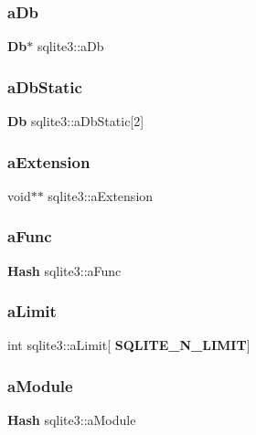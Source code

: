 \mbox{\label{structsqlite3_a0abe1dccdea5f43e6c49360b42749697}} 
\subsubsection{aDb}
{\footnotesize\ttfamily \textbf{ Db}$\ast$ sqlite3\+::a\+Db}

\mbox{\label{structsqlite3_ad99069213dff7fede71447b97d22d710}} 
\subsubsection{aDbStatic}
{\footnotesize\ttfamily \textbf{ Db} sqlite3\+::a\+Db\+Static[2]}

\mbox{\label{structsqlite3_aa97954113d8e35c97f8a3af534703f7b}} 
\subsubsection{aExtension}
{\footnotesize\ttfamily void$\ast$$\ast$ sqlite3\+::a\+Extension}

\mbox{\label{structsqlite3_a11ae87b7bc32ee0bbecbdcbf8d69074f}} 
\subsubsection{aFunc}
{\footnotesize\ttfamily \textbf{ Hash} sqlite3\+::a\+Func}

\mbox{\label{structsqlite3_ad8acf663e1619905094c9dfe4125157b}} 
\subsubsection{aLimit}
{\footnotesize\ttfamily int sqlite3\+::a\+Limit[\textbf{ S\+Q\+L\+I\+T\+E\+\_\+\+N\+\_\+\+L\+I\+M\+IT}]}

\mbox{\label{structsqlite3_a1e03e1fdee6fb7cb7337628c7f9b37c4}} 
\subsubsection{aModule}
{\footnotesize\ttfamily \textbf{ Hash} sqlite3\+::a\+Module}

